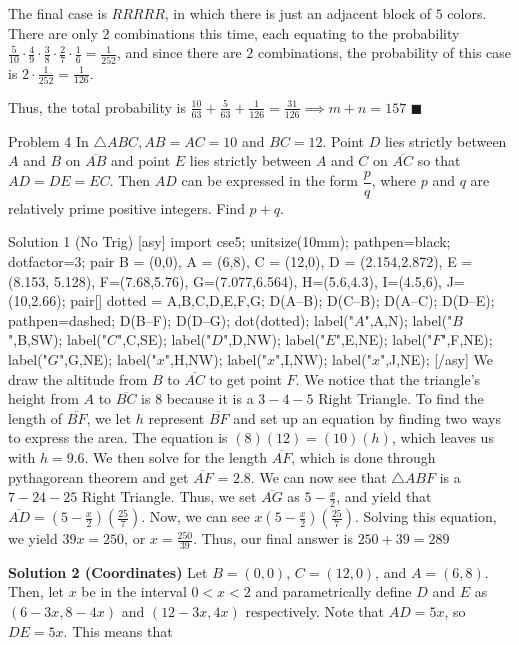 \documentclass[a4paper,11pt]{article}
\begin{document}
The final case is $RRRRR$, in which there is just an adjacent block of $5$ colors. There are only $2$ combinations this time, each equating to the probability $\frac{5}{10}\cdot \frac{4}{9}\cdot \frac{3}{8}\cdot \frac{2}{7}\cdot \frac{1}{6}=\frac{1}{252}$, and since there are $2$ combinations, the probability of this case is $2\cdot \frac{1}{252}=\frac{1}{126}$.

Thus, the total probability is $\frac{10}{63}+\frac{5}{63}+\frac{1}{126}=\frac{31}{126} \implies m+n=\boxed{157}$ \hfill $\blacksquare$
 
Problem 4
In $\triangle ABC, AB = AC = 10$ and $BC = 12$. Point $D$ lies strictly between $A$ and $B$ on $\overline{AB}$ and point $E$ lies strictly between $A$ and $C$ on $\overline{AC}$ so that $AD = DE = EC$. Then $AD$ can be expressed in the form $\dfrac{p}{q}$, where $p$ and $q$ are relatively prime positive integers. Find $p+q$.

Solution 1 (No Trig)
[asy] import cse5; unitsize(10mm); pathpen=black; dotfactor=3;  pair B = (0,0), A = (6,8), C = (12,0), D = (2.154,2.872), E = (8.153, 5.128), F=(7.68,5.76), G=(7.077,6.564), H=(5.6,4.3), I=(4.5,6), J=(10,2.66); pair[] dotted = {A,B,C,D,E,F,G};  D(A--B); D(C--B); D(A--C); D(D--E); pathpen=dashed; D(B--F); D(D--G);  dot(dotted); label("$A$",A,N); label("$B$",B,SW); label("$C$",C,SE); label("$D$",D,NW); label("$E$",E,NE); label("$F$",F,NE); label("$G$",G,NE); label("$x$",H,NW); label("$x$",I,NW); label("$x$",J,NE); [/asy]
We draw the altitude from $B$ to $\overline{AC}$ to get point $F$. We notice that the triangle's height from $A$ to $\overline{BC}$ is 8 because it is a $3-4-5$ Right Triangle. To find the length of $\overline{BF}$, we let $h$ represent $\overline{BF}$ and set up an equation by finding two ways to express the area. The equation is $(8)(12)=(10)(h)$, which leaves us with $h=9.6$. We then solve for the length $\overline{AF}$, which is done through pythagorean theorem and get $\overline{AF}$ = $2.8$. We can now see that $\triangle ABF$ is a $7-24-25$ Right Triangle. Thus, we set $\overline{AG}$ as $5-\tfrac{x}{2}$, and yield that $\overline{AD}=(5-\tfrac{x}{2})(\tfrac{25}{7})$. Now, we can see $x(5-\tfrac{x}{2})(\tfrac{25}{7})$. Solving this equation, we yield $39x=250$, or $x=\tfrac{250}{39}$. Thus, our final answer is $250+39=\boxed{289}$

\textbf{Solution 2 (Coordinates)}
Let $B = (0, 0)$, $C = (12, 0)$, and $A = (6, 8)$. Then, let $x$ be in the interval $0<x<2$ and parametrically define $D$ and $E$ as $(6-3x, 8-4x)$ and $(12-3x, 4x)$ respectively. Note that $AD = 5x$, so $DE = 5x$. This means that
\end{document}
